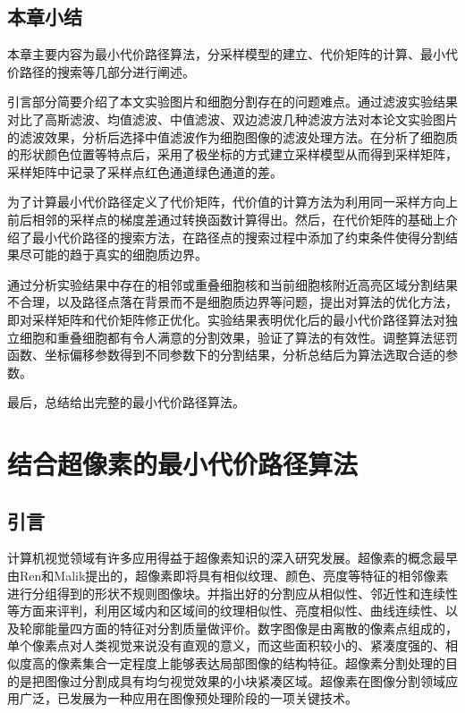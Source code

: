 \documentclass[nomlist,masters]{seuthesix}
\begin{document}
\section{本章小结}
本章主要内容为最小代价路径算法，分采样模型的建立、代价矩阵的计算、最小代价路径的搜索等几部分进行阐述。

引言部分简要介绍了本文实验图片和细胞分割存在的问题难点。通过滤波实验结果对比了高斯滤波、均值滤波、中值滤波、双边滤波几种滤波方法对本论文实验图片的滤波效果，分析后选择中值滤波作为细胞图像的滤波处理方法。在分析了细胞质的形状颜色位置等特点后，采用了极坐标的方式建立采样模型从而得到采样矩阵，采样矩阵中记录了采样点红色通道绿色通道的差。

为了计算最小代价路径定义了代价矩阵，代价值的计算方法为利用同一采样方向上前后相邻的采样点的梯度差通过转换函数计算得出。然后，在代价矩阵的基础上介绍了最小代价路径的搜索方法，在路径点的搜索过程中添加了约束条件使得分割结果尽可能的趋于真实的细胞质边界。

通过分析实验结果中存在的相邻或重叠细胞核和当前细胞核附近高亮区域分割结果不合理，以及路径点落在背景而不是细胞质边界等问题，提出对算法的优化方法，即对采样矩阵和代价矩阵修正优化。实验结果表明优化后的最小代价路径算法对独立细胞和重叠细胞都有令人满意的分割效果，验证了算法的有效性。调整算法惩罚函数、坐标偏移参数得到不同参数下的分割结果，分析总结后为算法选取合适的参数。

最后，总结给出完整的最小代价路径算法。

\chapter{结合超像素的最小代价路径算法}

\section{引言}
计算机视觉领域有许多应用得益于超像素知识的深入研究发展。超像素的概念最早由Ren和Malik\cite{Ren2003Learning}提出的，超像素即将具有相似纹理、颜色、亮度等特征的相邻像素进行分组得到的形状不规则图像块。并指出好的分割应从相似性、邻近性和连续性等方面来评判，利用区域内和区域间的纹理相似性、亮度相似性、曲线连续性、以及轮廓能量四方面的特征对分割质量做评价。数字图像是由离散的像素点组成的，单个像素点对人类视觉来说没有直观的意义，而这些面积较小的、紧凑度强的、相似度高的像素集合一定程度上能够表达局部图像的结构特征。超像素分割处理的目的是把图像过分割成具有均匀视觉效果的小块紧凑区域。超像素在图像分割领域应用广泛，已发展为一种应用在图像预处理阶段的一项关键技术。
\end{document}
